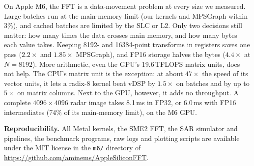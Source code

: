 \documentclass[conference]{IEEEtran}
\begin{document}
On Apple M6, the FFT is a data-movement problem at every size we measured. Large batches run at the
main-memory limit (our kernels and MPSGraph within 3\%), and cached batches are limited by the SLC or L2.
Only two decisions still matter: how many times the data crosses main memory, and how many bytes each
value takes. Keeping 8192- and 16384-point transforms in registers saves one pass ($2.2\times$ and
$1.85\times$ MPSGraph), and FP16 storage halves the bytes ($4.4\times$ at $N=8192$). More arithmetic,
even the GPU's 19.6\,TFLOPS matrix units, does not help. The CPU's matrix unit is the exception: at about
$47\times$ the speed of its vector units, it lets a radix-8 kernel beat vDSP by $1.5\times$ on batches
and by up to $5\times$ on matrix columns. Next to the GPU, however, it adds no throughput. A complete
$4096\times4096$ radar image takes 8.1\,ms in FP32, or 6.0\,ms with FP16 intermediates (74\% of its
main-memory limit), on the M6 GPU.

\smallskip
\noindent\textbf{Reproducibility.} All Metal kernels, the SME2 FFT, the SAR simulator and pipelines,
the benchmark programs, raw logs and plotting scripts are available under the MIT license in the
\texttt{m6/} directory of \url{https://github.com/aminems/AppleSiliconFFT}.



\end{document}
